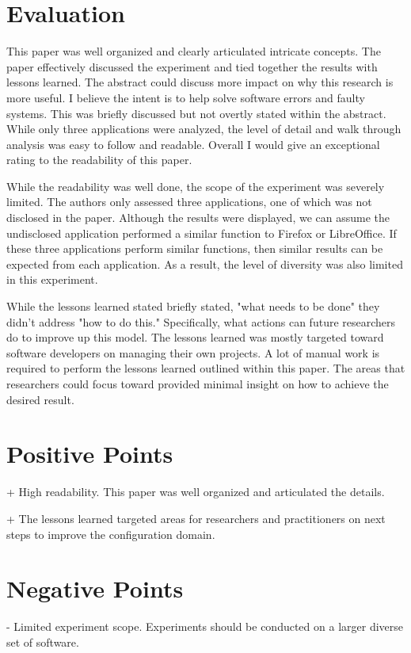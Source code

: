 \documentclass[conference]{IEEEtran}
\begin{document}
\section{Evaluation}
This paper was well organized and clearly articulated intricate concepts. The paper effectively discussed the experiment and tied together the results with lessons learned. The abstract could discuss more impact on why this research is more useful. I believe the intent is to help solve software errors and faulty systems. This was briefly discussed but not overtly stated within the abstract. While only three applications were analyzed, the level of detail and walk through analysis was easy to follow and readable. Overall I would give an exceptional rating to the readability of this paper.

While the readability was well done, the scope of the experiment was severely limited. The authors only assessed three applications, one of which was not disclosed in the paper. Although the results were displayed, we can assume the undisclosed application performed a similar function to Firefox or LibreOffice. If these three applications perform similar functions, then similar results can be expected from each application. As a result, the level of diversity was also limited in this experiment. 

While the lessons learned stated briefly stated, "what needs to be done" they didn't address "how to do this." Specifically, what actions can future researchers do to improve up this model. The lessons learned was mostly targeted toward software developers on managing their own projects. A lot of manual work  is required to perform the lessons learned outlined within this paper. The areas that researchers could focus toward provided minimal insight on how to achieve the desired result. 

\section{Positive Points}
+ High readability. This paper was well organized and articulated the details. 

+ The lessons learned targeted areas for researchers and practitioners on next steps to improve the configuration domain. 

\section{Negative Points}
- Limited experiment scope. Experiments should be conducted on a larger diverse set of software.
\end{document}
